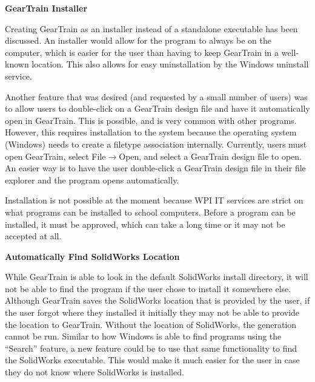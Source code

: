 \begin{doublespace}
\noindent\textbf{GearTrain Installer}

\noindent Creating GearTrain as an installer instead of a standalone executable has been discussed. An installer would allow for the program to always be on the computer, which is easier for the user than having to keep GearTrain in a well-known location. This also allows for easy uninstallation by the Windows uninstall service. 

Another feature that was desired (and requested by a small number of users) was to allow users to double-click on a GearTrain design file and have it automatically open in GearTrain. This is possible, and is very common with other programs. However, this requires installation to the system because the operating system (Windows) needs to create a filetype association internally. Currently, users must open GearTrain, select File$\rightarrow$Open, and select a GearTrain design file to open. An easier way is to have the user double-click a GearTrain design file in their file explorer and the program opens automatically.

Installation is not possible at the moment because WPI IT services are strict on what programs can be installed to school computers. Before a program can be installed, it must be approved, which can take a long time or it may not be accepted at all.

\noindent\textbf{Automatically Find SolidWorks Location}

\noindent While GearTrain is able to look in the default SolidWorks install directory, it will not be able to find the program if the user chose to install it somewhere else. Although GearTrain saves the SolidWorks location that is provided by the user, if the user forgot where they installed it initially they may not be able to provide the location to GearTrain. Without the location of SolidWorks, the generation cannot be run. Similar to how Windows is able to find programs using the ``Search'' feature, a new feature could be to use that same functionality to find the SolidWorks executable. This would make it much easier for the user in case they do not know where SolidWorks is installed.

\end{doublespace}
